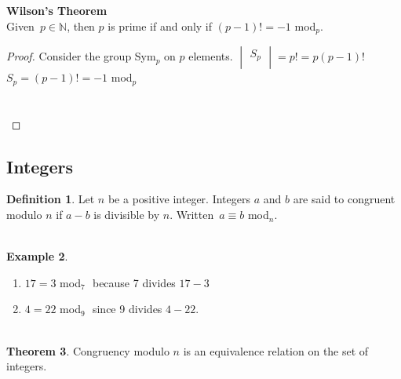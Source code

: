 \documentclass[11pt,a4paper]{article}
\theoremstyle{definition}
\newtheorem{thm}{Theorem}[subsection]
\newtheorem{defn}[thm]{Definition}
\newtheorem{exa}[thm]{Example}
\begin{document}
\textbf{Wilson's Theorem}\\
Given $\, p\in \mathbb{N}$, then $p$ is prime if and only if $(p - 1)! = -1$ mod$_p$.\\


\begin{proof}
Consider the group Sym$_p$ on $p$ elements.
$\begin{vmatrix}
S_p\\
\end{vmatrix} = p! = p(p-1)!$\\
$S_p = (p-1)! = -1$ mod$_p$\\\\\\
\end{proof}







\subsection{Integers}

\begin{defn}
Let $n$ be a positive integer. Integers $a$ and $b$ are said to congruent modulo $n$ if $a - b$ is divisible by $n$. Written $\, a\equiv b$ mod$_n$.\\\\
\end{defn}





\begin{exa}
\begin{enumerate}
\item[(i)] $17 = 3$ mod$_7\,\,$ because 7 divides $17 - 3$
\item[(ii)] $4 = 22$ mod$_9\,\,$ since 9 divides $4-22$.\\\\
\end{enumerate}
\end{exa}









\begin{thm}
Congruency modulo $n$ is an equivalence relation on the set of integers.\
\end{thm}
\end{document}
